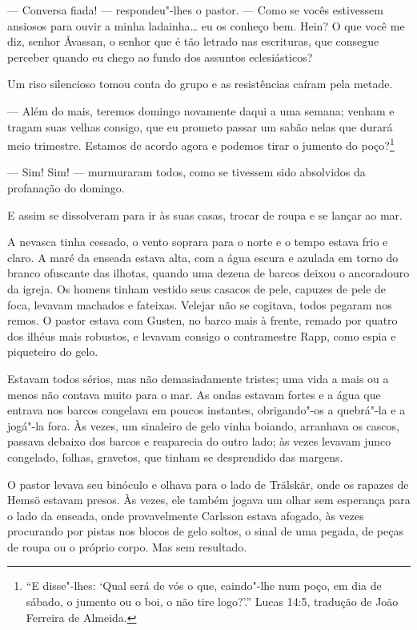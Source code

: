 --- Conversa fiada! --- respondeu"-lhes o pastor. --- Como se vocês estivessem ansiosos
para ouvir a minha ladainha\ldots{} eu os conheço bem. Hein? O que você me
diz, senhor Åvassan, o senhor que é tão letrado nas escrituras, que consegue perceber
quando eu chego ao fundo dos assuntos eclesiásticos?

Um riso silencioso tomou conta do grupo e as resistências caíram pela metade.

--- Além do mais, teremos domingo novamente daqui a uma semana; venham e tragam
suas velhas consigo, que eu prometo passar um sabão nelas que durará meio
trimestre. Estamos de acordo agora e podemos tirar o jumento do poço?\footnote{
``E disse"-lhes: `Qual será de vós o que, caindo"-lhe num poço, em dia de sábado, 
o jumento ou o boi, o não tire logo?'.'' Lucas 14:5, tradução de João Ferreira de Almeida.}

--- Sim! Sim! --- murmuraram todos, como se tivessem sido absolvidos da
profanação do domingo.

E assim se dissolveram para ir às suas casas, trocar de roupa e se lançar ao mar.

A nevasca tinha cessado, o vento soprara para o norte e o tempo estava frio e
claro. A maré da enseada estava alta, com a água escura e azulada em torno
do branco ofuscante das ilhotas, quando uma dezena de barcos deixou o
ancoradouro da igreja. Os homens tinham vestido seus casacos de pele, capuzes de
pele de foca, levavam machados e fateixas. Velejar não se cogitava, todos
pegaram nos remos. O pastor estava com Gusten, no barco mais à frente, remado
por quatro dos ilhéus mais robustos, e levavam consigo o contramestre Rapp, como
espia e piqueteiro do gelo.

Estavam todos sérios, mas não demasiadamente tristes; uma vida a mais ou a menos
não contava muito para o mar. As ondas estavam fortes e a água que
entrava nos barcos congelava em poucos instantes, obrigando"-os a quebrá"-la e a
jogá"-la fora. Às vezes, um sinaleiro de gelo vinha boiando, arranhava os
cascos, passava debaixo dos barcos e reaparecia do outro lado; às vezes 
levavam junco congelado, folhas, gravetos, que tinham se desprendido das margens.

O pastor levava seu binóculo e olhava para o lado de Trälskär, onde os rapazes
de Hemsö estavam presos. Às vezes, ele também jogava um olhar sem esperança para
o lado da enseada, onde provavelmente Carlsson estava afogado, às vezes
procurando por pistas nos blocos de gelo soltos, o sinal de uma pegada, de
peças de roupa ou o próprio corpo. Mas sem resultado.

